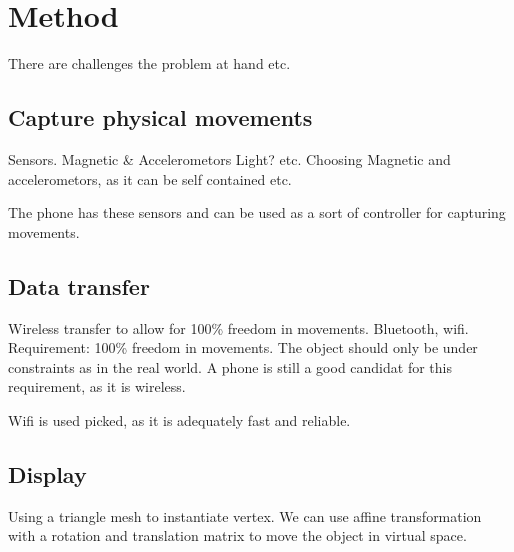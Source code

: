 \section{Method}
There are challenges the problem at hand etc.

\subsection{Capture physical movements}
Sensors. Magnetic \& Accelerometors Light? etc.
Choosing Magnetic and accelerometors, as it can be self contained etc.

The phone has these sensors and can be used as a sort of controller for capturing movements.

\subsection{Data transfer}
Wireless transfer to allow for 100\% freedom in movements. Bluetooth, wifi.
Requirement: 100\% freedom in movements. The object should only be under constraints as in the real world.
A phone is still a good candidat for this requirement, as it is wireless. 

Wifi is used picked, as it is adequately fast and reliable.

\subsection{Display}
Using a triangle mesh to instantiate vertex. 
We can use affine transformation with a rotation and translation matrix to move the object in virtual space.
